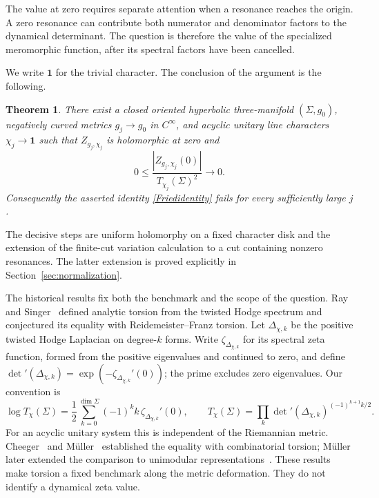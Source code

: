 \documentclass[11pt,letterpaper,reqno]{amsart}
\newtheorem{theorem}{Theorem}[section]
\theoremstyle{remark}
\begin{document}
The value at zero requires separate attention when a resonance reaches
the origin. A zero resonance can contribute both numerator and
denominator factors to the dynamical determinant. The question is
therefore the value of the specialized meromorphic function, after its
spectral factors have been cancelled.


We write $\mathbf1$ for the trivial character. The conclusion of the
argument is the following.
\begin{theorem}\label{mainresult}
There exist a closed oriented hyperbolic three-manifold $(\Sigma,g_0)$,
negatively curved metrics $g_j\to g_0$ in $C^\infty$, and acyclic unitary
line characters $\chi_j\to\mathbf1$ such that $Z_{g_j,\chi_j}$ is
holomorphic at zero and
\begin{equation}\label{mainratio}
 0\leq\frac{|Z_{g_j,\chi_j}(0)|}{T_{\chi_j}(\Sigma)^2}
 \longrightarrow0.
\end{equation}
Consequently the asserted identity \eqref{Friedidentity} fails for every
sufficiently large $j$.
\end{theorem}

The decisive steps are uniform holomorphy on a fixed character disk and the extension
of the finite-cut variation calculation to a cut containing nonzero
resonances. The latter extension is proved explicitly in
Section~\ref{sec:normalization}.

The historical results fix both the benchmark and the scope of the
question. Ray and Singer~\cite{RS} defined analytic torsion from the
twisted Hodge spectrum and conjectured its equality with
Reidemeister--Franz torsion. Let $\Delta_{\chi,k}$ be the positive
twisted Hodge Laplacian on degree-$k$ forms. Write
$\zeta_{\Delta_{\chi,k}}$ for its spectral zeta function, formed from
the positive eigenvalues and continued to zero, and define
$\det{}'(\Delta_{\chi,k})=\exp(-\zeta_{\Delta_{\chi,k}}'(0))$;
the prime excludes zero eigenvalues. Our convention is
\begin{equation}\label{lit:RS}
 \log T_\chi(\Sigma)
  =\frac12\sum_{k=0}^{\dim\Sigma}(-1)^k k\,
       \zeta_{\Delta_{\chi,k}}'(0),
 \qquad
 T_\chi(\Sigma)=\prod_k
       \det{}'(\Delta_{\chi,k})^{(-1)^{k+1}k/2}.
\end{equation}
For an acyclic unitary system this is independent of the Riemannian
metric. Cheeger~\cite{Cheeger} and M\"uller~\cite{Muller} established
the equality with combinatorial torsion; M\"uller later extended the
comparison to unimodular representations~\cite{Muller93}. These results
make torsion a fixed benchmark along the metric deformation. They do
not identify a dynamical zeta value.
\end{document}
